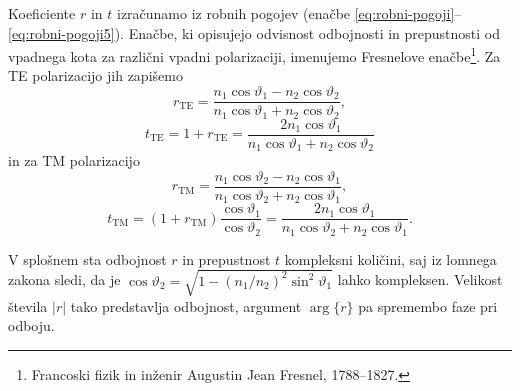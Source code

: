 Koeficiente $r$ in $t$ izračunamo iz robnih pogojev (enačbe 
\ref{eq:robni-pogoji}--\ref{eq:robni-pogoji5}). Enačbe, ki opisujejo odvisnost odbojnosti
in prepustnosti od vpadnega kota za različni vpadni polarizaciji, imenujemo
Fresnelove enačbe\footnote{Francoski fizik in inženir Augustin Jean Fresnel, 1788--1827.}.
Za TE polarizacijo jih zapišemo 
\begin{equation}
r_{\mathrm{TE}}=\frac{n_{1}\cos\vartheta_{1}-n_{2}\cos\vartheta_{2}}{n_{1}\cos\vartheta_{1}+n_{2}\cos\vartheta_{2}},
\label{eq:Fresnel1}
\end{equation}
\begin{equation}
t_{\mathrm{TE}}=1+r_{\mathrm{TE}}=\frac{2n_{1}\cos\vartheta_{1}}{n_{1}\cos\vartheta_{1}+n_{2}\cos\vartheta_{2}}
\end{equation}
in za TM polarizacijo
\begin{equation}
r_{\mathrm{TM}}=\frac{n_{1}\cos\vartheta_{2}-n_{2}\cos\vartheta_{1}}{n_{1}\cos\vartheta_{2}+n_{2}\cos\vartheta_{1}},
\end{equation}
\begin{equation}
t_{\mathrm{TM}}=(1+r_{\mathrm{TM}})\frac{\cos\vartheta_{1}}{\cos\vartheta_{2}}=\frac{2n_{1}\cos\vartheta_{1}}
{n_{1}\cos\vartheta_{2}+n_{2}\cos\vartheta_{1}}.
\label{eq:Fresnel2}
\end{equation}

V splošnem sta odbojnost $r$ in prepustnost $t$ kompleksni
količini, saj iz lomnega zakona sledi, da je $\cos\vartheta_{2}=
\sqrt{1-\left(n_{1}/n_{2}\right)^{2}\sin^{2}\vartheta_{1}}$
lahko kompleksen. Velikost števila $\left|r\right|$ tako predstavlja
odbojnost, argument $\arg\{r\}$ pa spremembo faze
pri odboju.

